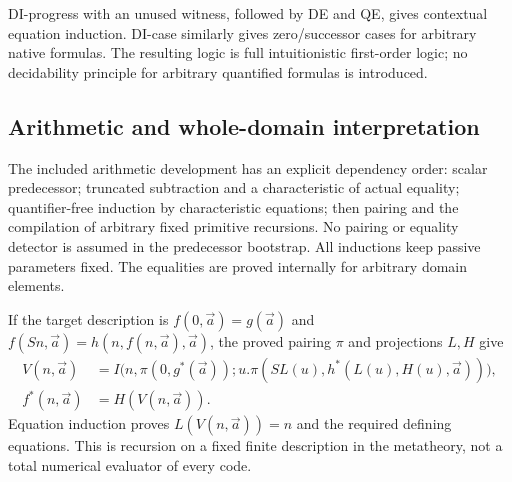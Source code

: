 \documentclass[11pt,letterpaper]{article}
\theoremstyle{definition}\newtheorem{definition}[theorem]{Definition}
\theoremstyle{remark}\newtheorem{remark}[theorem]{Remark}
\begin{document}
DI-progress with an unused witness, followed by DE and QE, gives
contextual equation induction. DI-case similarly gives zero/successor
cases for arbitrary native formulas. The resulting logic is full
intuitionistic first-order logic; no decidability principle for arbitrary
quantified formulas is introduced.

\subsection{Arithmetic and whole-domain interpretation}

The included arithmetic development has an explicit dependency order:
scalar predecessor; truncated subtraction and a characteristic of actual
equality; quantifier-free induction by characteristic equations; then
pairing and the compilation of arbitrary fixed primitive recursions.
No pairing or equality detector is assumed in the predecessor bootstrap.
All inductions keep passive parameters fixed. The equalities are proved
internally for arbitrary domain elements.

If the target description is
$f(0,\vec a)=g(\vec a)$ and
$f(Sn,\vec a)=h(n,f(n,\vec a),\vec a)$, the proved pairing $\pi$ and
projections $L,H$ give
\begin{align*}
 V(n,\vec a)&=I\bigl(n,\pi(0,g^*(\vec a));
 u.\pi(SL(u),h^*(L(u),H(u),\vec a))\bigr),\\
 f^*(n,\vec a)&=H(V(n,\vec a)).
\end{align*}
Equation induction proves $L(V(n,\vec a))=n$ and the required defining
equations. This is recursion on a fixed finite description in the
metatheory, not a total numerical evaluator of every code.
\end{document}
